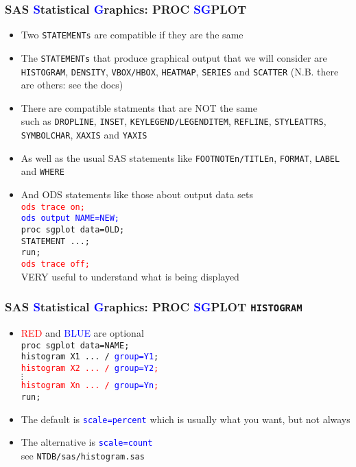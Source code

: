 \documentclass[11pt,pdftex,dvipsnames,usenames,helvetica]{beamer}
\begin{document}
\begin{frame}[fragile]
\frametitle{SAS \textcolor{blue}{S}tatistical \textcolor{blue}{G}raphics:
PROC \textcolor{blue}{SG}PLOT }
\begin{itemize}
\item Two {\tt STATEMENTs} are compatible if they are the same
\item The {\tt STATEMENTs} that produce graphical output that 
we will consider are {\tt HISTOGRAM},  {\tt DENSITY}, {\tt VBOX/HBOX},
{\tt HEATMAP}, {\tt SERIES} and {\tt SCATTER} (N.B. there
are others: see the docs)
\item There are compatible statments that are NOT the same\\
  such as {\tt DROPLINE}, {\tt INSET}, {\tt KEYLEGEND/LEGENDITEM},
  {\tt REFLINE}, {\tt STYLEATTRS}, {\tt SYMBOLCHAR},
{\tt XAXIS} and {\tt YAXIS}
\item As well as the usual SAS statements like
{\tt FOOTNOTEn/TITLEn}, {\tt FORMAT}, {\tt LABEL} and {\tt WHERE}
\item And ODS statements like those about output data sets\\
{\tt \textcolor{red}{ods trace on;}\\
\textcolor{blue}{ods output NAME=NEW;}\\
proc sgplot data=OLD;\\
STATEMENT ...;\\
run;\\
\textcolor{red}{ods trace off;}}\\
VERY useful to understand what is being displayed
\end{itemize}
\end{frame}

\begin{frame}[fragile]
\frametitle{SAS \textcolor{blue}{S}tatistical \textcolor{blue}{G}raphics:
PROC \textcolor{blue}{SG}PLOT {\tt HISTOGRAM}}
\begin{itemize}
\item \textcolor{red}{RED} and \textcolor{blue}{BLUE} are optional\\
{\tt proc sgplot data=NAME;\\
histogram X1 ...  / \textcolor{blue}{group=Y1};\\
\textcolor{red}{histogram X2 ... / \textcolor{blue}{group=Y2};}\\
$\vdots$\\
\textcolor{red}{histogram Xn ... / \textcolor{blue}{group=Yn};}\\
run;}
\item The default is \textcolor{blue}{\tt scale=percent}
which is usually what you want, but not always
\item The alternative is \textcolor{blue}{\tt scale=count}\\
see {\tt NTDB/sas/histogram.sas}
\end{itemize}
\end{frame}
\end{document}
